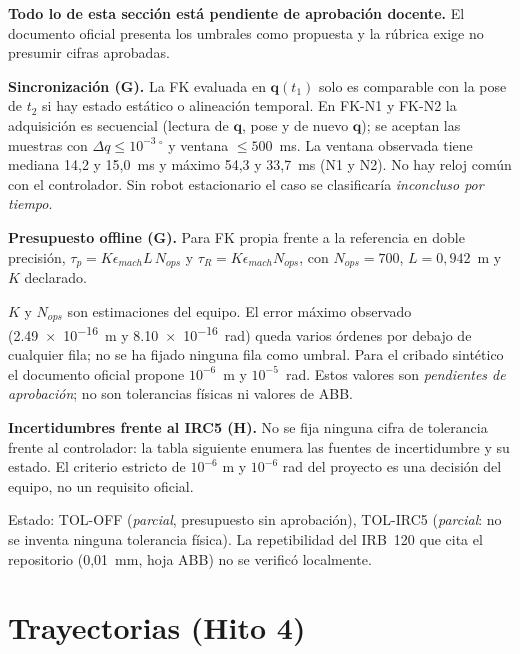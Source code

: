 \documentclass[10pt,a4paper]{article}
\begin{document}
\textbf{Todo lo de esta sección está pendiente de aprobación docente.} El documento oficial presenta los umbrales como propuesta y la rúbrica exige no presumir cifras aprobadas.

\textbf{Sincronización (G).} La FK evaluada en $\mathbf{q}(t_1)$ solo es comparable con la pose de $t_2$ si hay estado estático o alineación temporal. En FK-N1 y FK-N2 la adquisición es secuencial (lectura de $\mathbf{q}$, pose y de nuevo $\mathbf{q}$); se aceptan las muestras con $\Delta q\le10^{-3}\,^\circ$ y ventana $\le500$~ms. La ventana observada tiene mediana 14,2 y 15,0~ms y máximo 54,3 y 33,7~ms (N1 y N2). No hay reloj común con el controlador. Sin robot estacionario el caso se clasificaría \textit{inconcluso por tiempo}.

\textbf{Presupuesto offline (G).} Para FK propia frente a la referencia en doble precisión, $\tau_p=K\epsilon_{mach}L\,N_{ops}$ y $\tau_R=K\epsilon_{mach}N_{ops}$, con $N_{ops}=700$, $L=0{,}942$~m y $K$ declarado.



$K$ y $N_{ops}$ son estimaciones del equipo. El error máximo observado (\SI{2,49e-16}{m} y \SI{8,10e-16}{rad}) queda varios órdenes por debajo de cualquier fila; no se ha fijado ninguna fila como umbral. Para el cribado sintético el documento oficial propone $10^{-6}$~m y $10^{-5}$~rad. Estos valores son \textit{pendientes de aprobación}; no son tolerancias físicas ni valores de ABB.

\textbf{Incertidumbres frente al IRC5 (H).} No se fija ninguna cifra de tolerancia frente al controlador: la tabla siguiente enumera las fuentes de incertidumbre y su estado. El criterio estricto de $10^{-6}$ m y $10^{-6}$ rad del proyecto es una decisión del equipo, no un requisito oficial.



Estado: TOL-OFF (\textit{parcial}, presupuesto sin aprobación), TOL-IRC5 (\textit{parcial}: no se inventa ninguna tolerancia física). La repetibilidad del IRB~120 que cita el repositorio (0,01~mm, hoja ABB) no se verificó localmente.

\section{Trayectorias (Hito 4)}
\label{sec:tray}
\end{document}

